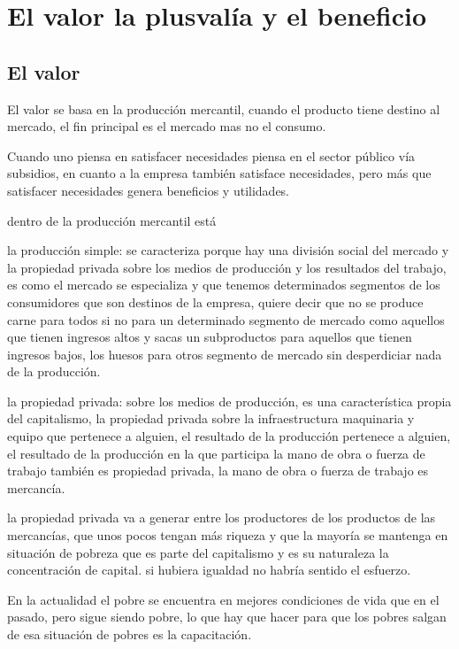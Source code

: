 \documentclass[
  letterpaper,
  DIV=11,
  numbers=noendperiod]{scrartcl}
\begin{document}
\hypertarget{el-valor-la-plusvaluxeda-y-el-beneficio}{%
\section{El valor la plusvalía y el
beneficio}\label{el-valor-la-plusvaluxeda-y-el-beneficio}}

\hypertarget{el-valor}{%
\subsection{El valor}\label{el-valor}}

El valor se basa en la producción mercantil, cuando el producto tiene
destino al mercado, el fin principal es el mercado mas no el consumo.

Cuando uno piensa en satisfacer necesidades piensa en el sector público
vía subsidios, en cuanto a la empresa también satisface necesidades,
pero más que satisfacer necesidades genera beneficios y utilidades.

dentro de la producción mercantil está

la producción simple: se caracteriza porque hay una división social del
mercado y la propiedad privada sobre los medios de producción y los
resultados del trabajo, es como el mercado se especializa y que tenemos
determinados segmentos de los consumidores que son destinos de la
empresa, quiere decir que no se produce carne para todos si no para un
determinado segmento de mercado como aquellos que tienen ingresos altos
y sacas un subproductos para aquellos que tienen ingresos bajos, los
huesos para otros segmento de mercado sin desperdiciar nada de la
producción.

la propiedad privada: sobre los medios de producción, es una
característica propia del capitalismo, la propiedad privada sobre la
infraestructura maquinaria y equipo que pertenece a alguien, el
resultado de la producción pertenece a alguien, el resultado de la
producción en la que participa la mano de obra o fuerza de trabajo
también es propiedad privada, la mano de obra o fuerza de trabajo es
mercancía.

la propiedad privada va a generar entre los productores de los productos
de las mercancías, que unos pocos tengan más riqueza y que la mayoría se
mantenga en situación de pobreza que es parte del capitalismo y es su
naturaleza la concentración de capital. si hubiera igualdad no habría
sentido el esfuerzo.

En la actualidad el pobre se encuentra en mejores condiciones de vida
que en el pasado, pero sigue siendo pobre, lo que hay que hacer para que
los pobres salgan de esa situación de pobres es la capacitación.
\end{document}
